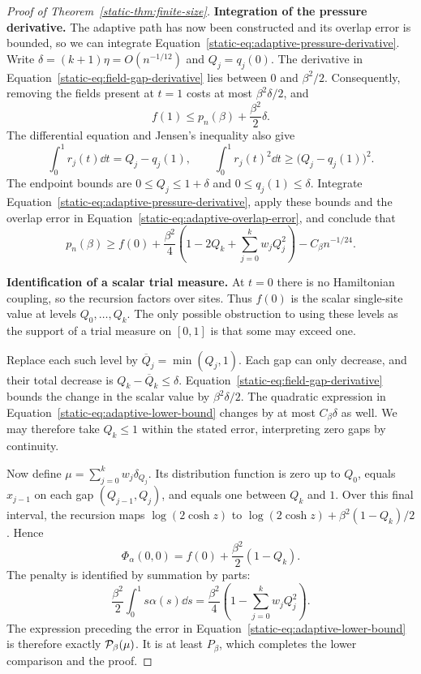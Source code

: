 \begin{proof}[Proof of Theorem~\ref{static-thm:finite-size}]
\par\medskip\noindent\textbf{Integration of the pressure derivative.}\enspace
The adaptive path has now been constructed and its overlap error is
bounded, so we can integrate
Equation~\eqref{static-eq:adaptive-pressure-derivative}.
Write $\delta=(k+1)\eta=O(n^{-1/12})$ and $Q_j=q_j(0)$.
The derivative in Equation~\eqref{static-eq:field-gap-derivative}
lies between $0$ and $\beta^2/2$. Consequently, removing the fields present at $t=1$
costs at most $\beta^2\delta/2$, and
\[
 f(1)\le p_n(\beta)+\frac{\beta^2}{2}\delta.
\]
The differential equation and Jensen's inequality also give
\[
 \int_0^1r_j(t)\dd t=Q_j-q_j(1),\qquad
 \int_0^1r_j(t)^2\dd t\ge\bigl(Q_j-q_j(1)\bigr)^2.
\]
The endpoint bounds are $0\le Q_j\le1+\delta$ and
$0\le q_j(1)\le\delta$. Integrate
Equation~\eqref{static-eq:adaptive-pressure-derivative}, apply these
bounds and the overlap error in
Equation~\eqref{static-eq:adaptive-overlap-error}, and conclude that
\begin{equation}\label{static-eq:adaptive-lower-bound}
 p_n(\beta)\ge
 f(0)+\frac{\beta^2}{4}
       \left(1-2Q_k+\sum_{j=0}^kw_jQ_j^2\right)
       -C_\beta n^{-1/24}.
\end{equation}
\par\medskip\noindent\textbf{Identification of a scalar trial measure.}\enspace
At $t=0$ there is no Hamiltonian coupling, so the recursion factors
over sites. Thus $f(0)$ is the scalar single-site value at levels
$Q_0,\ldots,Q_k$. The only possible obstruction to using these
levels as the support of a trial measure on $[0,1]$ is that some
may exceed one.

Replace each such level by $\overline Q_j=\min(Q_j,1)$.
Each gap can only decrease, and their total decrease is
$Q_k-\overline Q_k\le\delta$. Equation~\eqref{static-eq:field-gap-derivative}
bounds the change in the scalar value by $\beta^2\delta/2$.
The quadratic expression in
Equation~\eqref{static-eq:adaptive-lower-bound} changes by at most
$C_\beta\delta$ as well. We may therefore take $Q_k\le1$ within
the stated error, interpreting zero gaps by continuity.

Now define $\mu=\sum_{j=0}^kw_j\delta_{Q_j}$. Its distribution
function is zero up to $Q_0$, equals $x_{j-1}$ on each gap
$(Q_{j-1},Q_j)$, and equals one between $Q_k$ and $1$.
Over this final interval, the recursion maps $\log(2\cosh z)$ to
$\log(2\cosh z)+\beta^2(1-Q_k)/2$. Hence
\[
 \Phi_\alpha(0,0)=f(0)+\frac{\beta^2}{2}(1-Q_k).
\]
The penalty is identified by summation by parts:
\[
 \frac{\beta^2}{2}\int_0^1s\alpha(s)\dd s
 =\frac{\beta^2}{4}\left(1-\sum_{j=0}^kw_jQ_j^2\right).
\]
The expression preceding the error in
Equation~\eqref{static-eq:adaptive-lower-bound} is therefore exactly
$\mathcal P_\beta(\mu)$. It is at least $P_\beta$, which completes the
lower comparison and the proof.
\end{proof}
